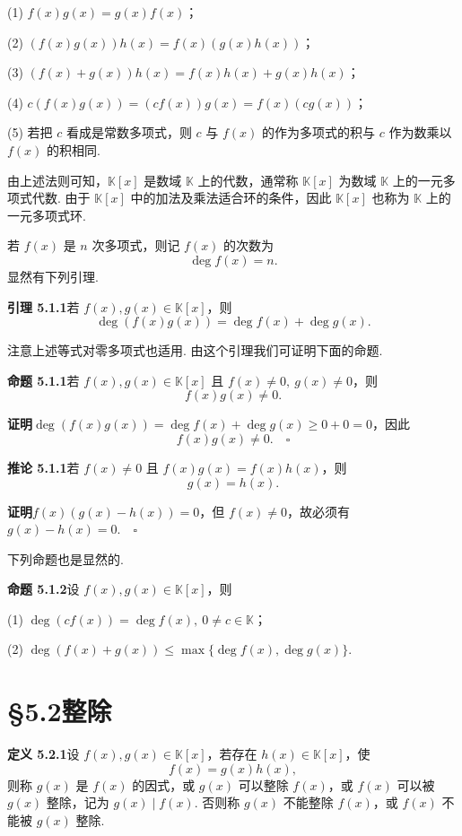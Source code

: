 \documentclass[UTF8, 12pt, fontset=fandol, oneside]{ctexart}
\begin{document}
(1) $f(x)g(x)=g(x)f(x)$；

(2) $(f(x)g(x))h(x)=f(x)(g(x)h(x))$；

(3) $(f(x)+g(x))h(x)=f(x)h(x)+g(x)h(x)$；

(4) $c(f(x)g(x))=(cf(x))g(x)=f(x)(cg(x))$；

(5) 若把 $c$ 看成是常数多项式，则 $c$ 与 $f(x)$ 的作为多项式的积与 $c$ 作为数乘以 $f(x)$ 的积相同.

由上述法则可知，$\mathbb{K}[x]$ 是数域 $\mathbb{K}$ 上的代数，通常称 $\mathbb{K}[x]$ 为数域 $\mathbb{K}$ 上的一元多项式代数. 由于 $\mathbb{K}[x]$ 中的加法及乘法适合环的条件，因此 $\mathbb{K}[x]$ 也称为 $\mathbb{K}$ 上的一元多项式环.

若 $f(x)$ 是 $n$ 次多项式，则记 $f(x)$ 的次数为
\[
\deg f(x)=n.
\]
显然有下列引理.

\noindent\textbf{引理 5.1.1}\quad 若 $f(x),g(x)\in\mathbb{K}[x]$，则
\[
\deg(f(x)g(x))=\deg f(x)+\deg g(x).
\]

注意上述等式对零多项式也适用. 由这个引理我们可证明下面的命题.

\noindent\textbf{命题 5.1.1}\quad 若 $f(x),g(x)\in\mathbb{K}[x]$ 且 $f(x)\neq 0,\ g(x)\neq 0$，则
\[
f(x)g(x)\neq 0.
\]

\noindent\textbf{证明}\quad $\deg(f(x)g(x))=\deg f(x)+\deg g(x)\geq 0+0=0$，因此
\[
f(x)g(x)\neq 0.\quad \square
\]

\noindent\textbf{推论 5.1.1}\quad 若 $f(x)\neq 0$ 且 $f(x)g(x)=f(x)h(x)$，则
\[
g(x)=h(x).
\]

\noindent\textbf{证明}\quad $f(x)(g(x)-h(x))=0$，但 $f(x)\neq 0$，故必须有 $g(x)-h(x)=0.\quad \square$

下列命题也是显然的.

\noindent\textbf{命题 5.1.2}\quad 设 $f(x),g(x)\in\mathbb{K}[x]$，则

(1) $\deg(cf(x))=\deg f(x),\ 0\neq c\in\mathbb{K}$；

(2) $\deg(f(x)+g(x))\leq \max\{\deg f(x),\deg g(x)\}$.

\section*{§5.2\quad 整除}

\noindent\textbf{定义 5.2.1}\quad 设 $f(x),g(x)\in\mathbb{K}[x]$，若存在 $h(x)\in\mathbb{K}[x]$，使
\[
f(x)=g(x)h(x),
\]
则称 $g(x)$ 是 $f(x)$ 的因式，或 $g(x)$ 可以整除 $f(x)$，或 $f(x)$ 可以被 $g(x)$ 整除，记为 $g(x)\mid f(x)$. 否则称 $g(x)$ 不能整除 $f(x)$，或 $f(x)$ 不能被 $g(x)$ 整除.
\end{document}
